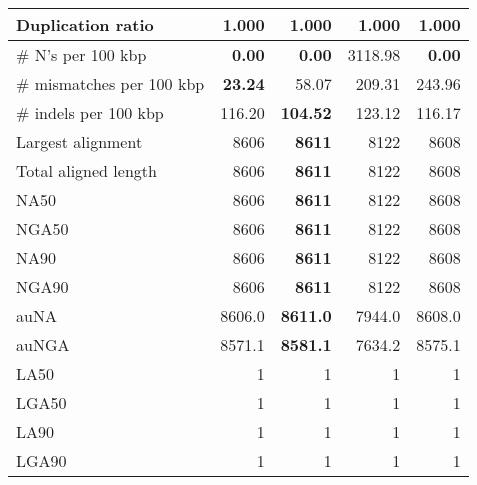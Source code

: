 \documentclass[12pt,a4paper]{article}
\begin{document}
\begin{table}[ht]
\begin{center}
\begin{tabular}{|l*{4}{|r}|}
Duplication ratio & 1.000 & 1.000 & 1.000 & 1.000 \\ \hline
\# N's per 100 kbp & {\bf 0.00} & {\bf 0.00} & 3118.98 & {\bf 0.00} \\ \hline
\# mismatches per 100 kbp & {\bf 23.24} & 58.07 & 209.31 & 243.96 \\ \hline
\# indels per 100 kbp & 116.20 & {\bf 104.52} & 123.12 & 116.17 \\ \hline
Largest alignment & 8606 & {\bf 8611} & 8122 & 8608 \\ \hline
Total aligned length & 8606 & {\bf 8611} & 8122 & 8608 \\ \hline
NA50 & 8606 & {\bf 8611} & 8122 & 8608 \\ \hline
NGA50 & 8606 & {\bf 8611} & 8122 & 8608 \\ \hline
NA90 & 8606 & {\bf 8611} & 8122 & 8608 \\ \hline
NGA90 & 8606 & {\bf 8611} & 8122 & 8608 \\ \hline
auNA & 8606.0 & {\bf 8611.0} & 7944.0 & 8608.0 \\ \hline
auNGA & 8571.1 & {\bf 8581.1} & 7634.2 & 8575.1 \\ \hline
LA50 & 1 & 1 & 1 & 1 \\ \hline
LGA50 & 1 & 1 & 1 & 1 \\ \hline
LA90 & 1 & 1 & 1 & 1 \\ \hline
LGA90 & 1 & 1 & 1 & 1 \\ \hline
\end{tabular}
\end{center}
\end{table}
\end{document}
